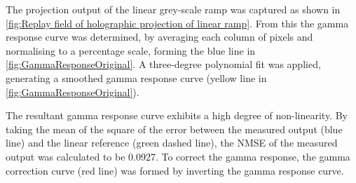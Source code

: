 The projection output of the linear grey-scale ramp was captured as shown in \cref{fig:Replay field of holographic projection of linear ramp}. From this the gamma response curve was determined, by averaging each column of pixels and normalising to a percentage scale, forming the blue line in \cref{fig:GammaResponseOriginal}. A three-degree polynomial fit was applied, generating a smoothed gamma response curve (yellow line in \cref{fig:GammaResponseOriginal}).

The resultant gamma response curve exhibits a high degree of non-linearity. By taking the mean of the square of the error between the measured output (blue line) and the linear reference (green dashed line), the NMSE of the measured output was calculated to be 0.0927. To correct the gamma response, the gamma correction curve (red line) was formed by inverting the gamma response curve.


